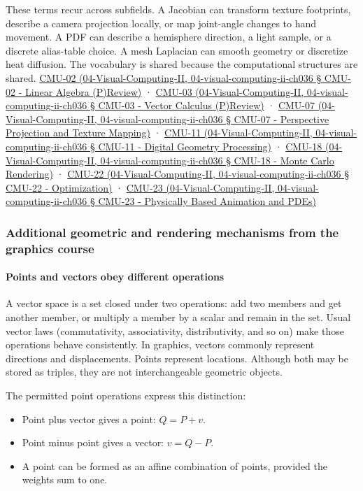 These terms recur across subfields. A Jacobian can transform texture footprints, describe a camera projection locally, or map joint-angle changes to hand movement. A PDF can describe a hemisphere direction, a light sample, or a discrete alias-table choice. A mesh Laplacian can smooth geometry or discretize heat diffusion. The vocabulary is shared because the computational structures are shared. \href{}{CMU-02 (04-Visual-Computing-II, 04-visual-computing-ii-ch036 § CMU-02 - Linear Algebra (P)Review)} · \href{}{CMU-03 (04-Visual-Computing-II, 04-visual-computing-ii-ch036 § CMU-03 - Vector Calculus (P)Review)} · \href{}{CMU-07 (04-Visual-Computing-II, 04-visual-computing-ii-ch036 § CMU-07 - Perspective Projection and Texture Mapping)} · \href{}{CMU-11 (04-Visual-Computing-II, 04-visual-computing-ii-ch036 § CMU-11 - Digital Geometry Processing)} · \href{}{CMU-18 (04-Visual-Computing-II, 04-visual-computing-ii-ch036 § CMU-18 - Monte Carlo Rendering)} · \href{}{CMU-22 (04-Visual-Computing-II, 04-visual-computing-ii-ch036 § CMU-22 - Optimization)} · \href{}{CMU-23 (04-Visual-Computing-II, 04-visual-computing-ii-ch036 § CMU-23 - Physically Based Animation and PDEs)}

\subsubsection{Additional geometric and rendering mechanisms from the graphics course}\label{additional-geometric-and-rendering-mechanisms-from-the-graphics-course}

\paragraph{Points and vectors obey different operations}\label{points-and-vectors-obey-different-operations}

A vector space is a set closed under two operations: add two members and get another member, or multiply a member by a scalar and remain in the set. Usual vector laws (commutativity, associativity, distributivity, and so on) make those operations behave consistently. In graphics, vectors commonly represent directions and displacements. Points represent locations. Although both may be stored as triples, they are not interchangeable geometric objects.

The permitted point operations express this distinction:

\begin{itemize}
\tightlist
\item
  Point plus vector gives a point: \(Q=P+v\).
\item
  Point minus point gives a vector: \(v=Q-P\).
\item
  A point can be formed as an affine combination of points, provided the weights sum to one.
\end{itemize}

